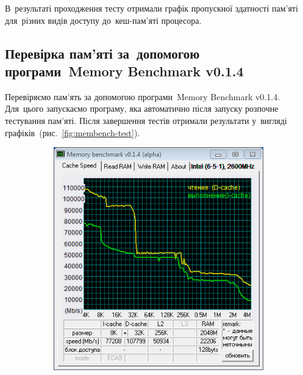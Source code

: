\documentclass[
	a4paper,
	oneside,
	BCOR = 10mm,
	DIV = 12,
	12pt,
	headings = normal,
]{scrartcl}
\begin{document}
			В~результаті проходження тесту отримали графік пропускної здатності пам'яті для~різних видів доступу до~кеш-пам'яті процесора. 

		\subsection{Перевірка пам'яті за~допомогою програми~\textenglish{Memory Benchmark v0.1.4}}
			Перевіряємо пам'ять за допомогою програми~\textenglish{Memory Benchmark v0.1.4}. Для~цього запускаємо програму, яка автоматично після запуску розпочне тестування пам'яті. Після завершення тестів отримали результати у~вигляді графіків~(рис.~\ref{fig:membench-test}). 

			\begin{figure}[!htbp]
				\centering
				\begin{subfigure}[t]{\columnwidth / 3}
					\centering
					\includegraphics[width = \columnwidth]{./assets/y03s02-pcdiag-lab-02-p02-01.png}
					\caption{}
					\label{subfig:membench-test-01}
				\end{subfigure}%
				\begin{subfigure}[t]{\columnwidth / 3}
					\centering

\end{subfigure}
\end{figure}
\end{document}
